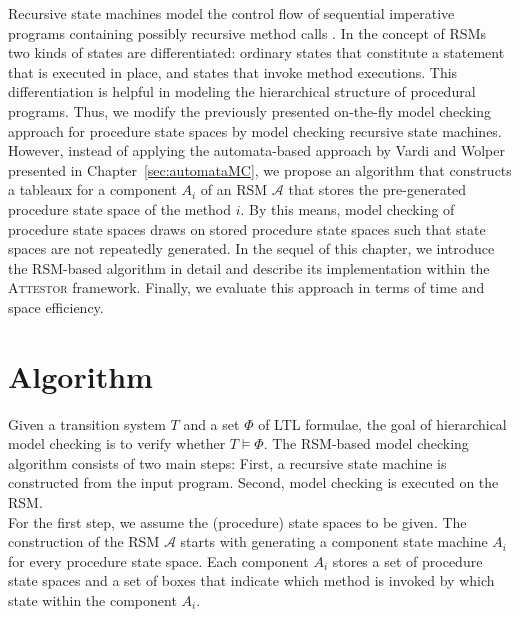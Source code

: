 \documentclass[a4paper, 12pt, twoside]{report}
\begin{document}
	Recursive state machines model the control flow of sequential imperative programs containing possibly recursive method calls \cite{alur2001analysis}. In the concept of RSMs two kinds of states are differentiated: ordinary states that constitute a statement that is executed in place, and states that invoke method executions. This differentiation is helpful in modeling the hierarchical structure of procedural programs. Thus, we modify the previously presented on-the-fly model checking approach for procedure state spaces by model checking recursive state machines. However, instead of applying the automata-based approach by Vardi and Wolper presented in Chapter~\ref{sec:automataMC}, we propose an algorithm that constructs a tableaux for a component $A_i$ of an RSM $\mathcal{A}$ that stores the pre-generated procedure state space of the method $i$. By this means, model checking of procedure state spaces draws on stored procedure state spaces such that state spaces are not repeatedly generated. In the sequel of this chapter, we introduce the RSM-based algorithm in detail and describe its implementation within the \textsc{Attestor} framework. Finally, we evaluate this approach in terms of time and space efficiency.

	\section{Algorithm}
	
	Given a transition system $T$ and a set $\Phi$ of LTL formulae, the goal of hierarchical model checking is to verify whether $T \models \Phi$. The RSM-based model checking algorithm consists of two main steps: First, a recursive state machine is constructed from the input program. Second, model checking is executed on the RSM.\\
	
	For the first step, we assume the (procedure) state spaces to be given. The construction of the RSM $\mathcal{A}$ starts with generating a component state machine $A_i$ for every procedure state space. Each component $A_i$ stores a set of procedure state spaces and a set of boxes that indicate which method is invoked by which state within the component $A_i$. \\
	
\end{document}

